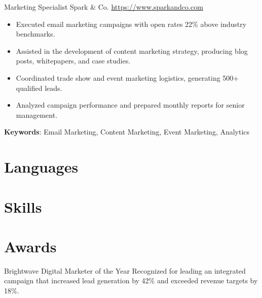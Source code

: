 \documentclass[a4paper, serif, 10pt]{moderncv}
\begin{document}
        {Marketing Specialist}
        {Spark \& Co.}
        {\url{https://www.sparkandco.com}}
        {}
        {\begin{itemize}
\item Executed email marketing campaigns with open rates 22\% above industry benchmarks.
\item Assisted in the development of content marketing strategy, producing blog posts, whitepapers, and case studies.
\item Coordinated trade show and event marketing logistics, generating 500+ qualified leads.
\item Analyzed campaign performance and prepared monthly reports for senior management.
\end{itemize}
\textbf{Keywords}: Email Marketing, Content Marketing, Event Marketing, Analytics}
\section{Languages}

\section{Skills}

\section{Awards}

        {Brightwave Digital}
        {Marketer of the Year}
        {}
        {}
        {Recognized for leading an integrated campaign that increased lead generation by 42\% and exceeded revenue targets by 18\%.}
\end{document}
